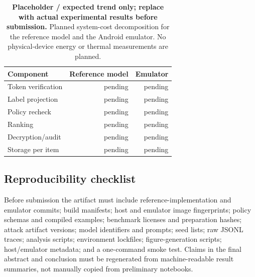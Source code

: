 \begin{table}[t]
\centering
\caption{\textbf{Placeholder / expected trend only; replace with actual experimental results before submission.} Planned system-cost decomposition for the reference model and the Android emulator. No physical-device energy or thermal measurements are planned.}
\label{tab:pending-overhead}
\small
\begin{tabular}{lrr}
\toprule
Component & Reference model & Emulator \\
\midrule
Token verification & pending & pending \\
Label projection & pending & pending \\
Policy recheck & pending & pending \\
Ranking & pending & pending \\
Decryption/audit & pending & pending \\
Storage per item & pending & pending \\
\bottomrule
\end{tabular}
\end{table}



\subsection{Reproducibility checklist}

Before submission the artifact must include reference-implementation and emulator commits; build manifests; host and emulator image fingerprints; policy schemas and compiled examples; benchmark licenses and preparation hashes; attack artifact versions; model identifiers and prompts; seed lists; raw JSONL traces; analysis scripts; environment lockfiles; figure-generation scripts; host/emulator metadata; and a one-command smoke test. Claims in the final abstract and conclusion must be regenerated from machine-readable result summaries, not manually copied from preliminary notebooks.
